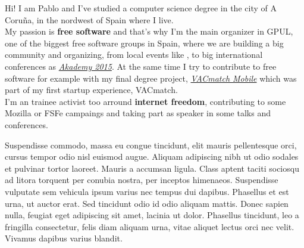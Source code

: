 \documentclass[11pt, a4paper]{awesome-cv} %
\begin{document}
\makecvheader %

\makelettertitle %


\begin{cvletter}



Hi! I am Pablo and I've studied a computer science degree in the city of A Coruña, in the nordwest of Spain where I live. \\
My passion is \textbf{free software} and that's why I'm the main organizer in GPUL, one of the biggest free software groups in Spain, where we are building a big community and organizing, from local events like , to big international conferences as \emph{\href{https://akademy.kde.org/2015}{Akademy 2015}}.
At the same time I try to contribute to free software for example with my final degree project, \emph{\href{https://github.com/vacmatch/vacmatch-mobile}{VACmatch Mobile}} which was part of my first startup experience, VACmatch.\\
I'm an trainee activist too arround \textbf{internet freedom}, contributing to some Mozilla or FSFe campaings and taking part as speaker in some talks and conferences.



Suspendisse commodo, massa eu congue tincidunt, elit mauris pellentesque orci, cursus tempor odio nisl euismod augue. Aliquam adipiscing nibh ut odio sodales et pulvinar tortor laoreet. Mauris a accumsan ligula. Class aptent taciti sociosqu ad litora torquent per conubia nostra, per inceptos himenaeos. Suspendisse vulputate sem vehicula ipsum varius nec tempus dui dapibus. Phasellus et est urna, ut auctor erat. Sed tincidunt odio id odio aliquam mattis. Donec sapien nulla, feugiat eget adipiscing sit amet, lacinia ut dolor. Phasellus tincidunt, leo a fringilla consectetur, felis diam aliquam urna, vitae aliquet lectus orci nec velit. Vivamus dapibus varius blandit.



\end{cvletter}
\end{document}
